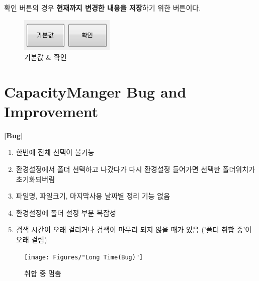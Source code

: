 \documentclass[a4paper, 13pt]{article} %
\begin{document}
		확인 버튼의 경우 \textbf{현재까지 변경한 내용을 저장}하기 위한 버튼이다.
		
		\begin{figure}[h]
			\centering
			\includegraphics[width=0.4\textwidth]{Figures/button}
			\caption{기본값 \& 확인}
			\label{fig:button}
		\end{figure}
	
	\clearpage
	\section{CapacityManger Bug and Improvement}

		
		\LARGE \bf |Bug| \newline
		
		\begin{enumerate}
		\large \item 한번에 전체 선택이 불가능 \newline
		
		\item 환경설정에서 폴더 선택하고 나갔다가 다시 환경설정 들어가면
		선택한 폴더위치가 초기화되버림 \newline
		
		\item 파일명, 파일크기, 마지막사용 날짜별 정리 기능 없음 \newline
		
		\item 환경설정에 폴더 설정 부분 복잡성 \newline
		
		\item 검색 시간이 오래 걸리거나 검색이 마무리 되지 않을 때가 있음
		('폴더 취합 중'이 오래 걸림) \newline \newline
		
	\end{enumerate}
		
		\begin{figure}[h]
			
			\centering
			
			\texttt{[image: Figures/"Long Time(Bug)"]}
			
			\caption{취합 중 멈춤}
			
			\label{fig:long-time}
			
		\end{figure}
		
\end{document}
